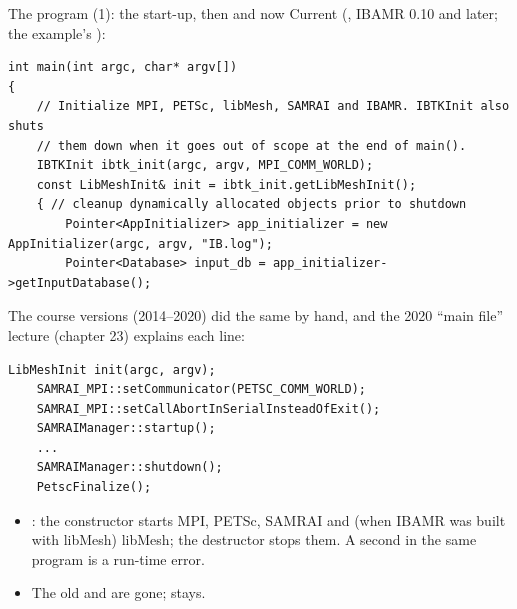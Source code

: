 \documentclass[aspectratio=169,11pt]{beamer}
\begin{document}
\begin{frame}[fragile]{The program (1): the start-up, then and now}
\label{fr:startup}
\footnotesize
Current (, IBAMR 0.10 and later; the example's ):
\begin{lstlisting}[style=cpptiny]
int main(int argc, char* argv[])
{
    // Initialize MPI, PETSc, libMesh, SAMRAI and IBAMR. IBTKInit also shuts
    // them down when it goes out of scope at the end of main().
    IBTKInit ibtk_init(argc, argv, MPI_COMM_WORLD);
    const LibMeshInit& init = ibtk_init.getLibMeshInit();
    { // cleanup dynamically allocated objects prior to shutdown
        Pointer<AppInitializer> app_initializer = new AppInitializer(argc, argv, "IB.log");
        Pointer<Database> input_db = app_initializer->getInputDatabase();
\end{lstlisting}
The course versions (2014--2020) did the same by hand, and the 2020 ``main file'' lecture (chapter 23) explains each line:
\begin{lstlisting}[style=cpptiny]
    LibMeshInit init(argc, argv);
    SAMRAI_MPI::setCommunicator(PETSC_COMM_WORLD);
    SAMRAI_MPI::setCallAbortInSerialInsteadOfExit();
    SAMRAIManager::startup();
    ...
    SAMRAIManager::shutdown();
    PetscFinalize();
\end{lstlisting}
\begin{itemize}
  \item {}: the constructor starts MPI, PETSc, SAMRAI and (when IBAMR was built with libMesh) libMesh; the destructor stops them. A second  in the same program is a run-time error.
  \item The old  and  are gone;  stays.
\end{itemize}
\end{frame}
\end{document}

